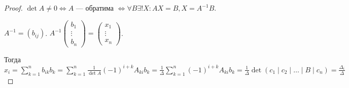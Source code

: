 \begin{proof}
    $\det A \neq 0 \iff A$ --- обратима  $\iff \forall B \exists! X\!: AX = B, X = A^{-1}B$.

    $A^{-1} = (b_{ij})$.  $A^{-1} \begin{pmatrix} b_1 \\ \vdots \\ b_n \end{pmatrix} = \begin{pmatrix} x_1 \\ \vdots \\ x_n \end{pmatrix} $.

    Тогда $x_i = \sum\limits_{k=1}^n b_{ik}b_k = \sum\limits_{k=1}^n \frac{1}{\det A}(-1)^{i+k} A_{ki} b_k = \frac{1}{\Delta}\sum\limits_{k=1}^n (-1)^{i+k} A_{ki} b_k = \frac{1}{\Delta} \det (c_1 \mid c_2 \mid \ldots \mid B \mid c_n) = \frac{\Delta_i}{\Delta}$ 
\end{proof}

